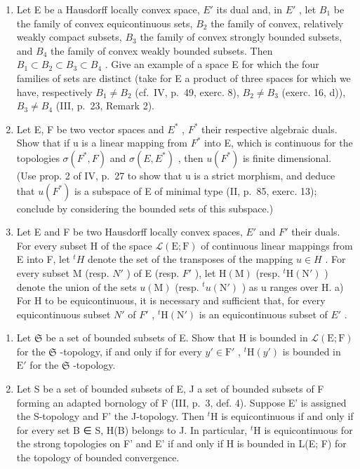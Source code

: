 \begin{enumerate}
\def\labelenumi{\arabic{enumi})}
\setcounter{enumi}{16}
\item
  Let E be a Hausdorff locally convex space, \(E'\) its dual and, in \(E'\) , let \(B_{1}\) be the family of convex equicontinuous sets, \(B_{2}\) the family of convex, relatively weakly compact subsets, \(B_{3}\) the family of convex strongly bounded subsets, and \(B_{4}\) the family of convex weakly bounded subsets. Then \(B_{1} \subset B_{2} \subset B_{3} \subset B_{4}\) . Give an example of a space E for which the four families of sets are distinct (take for E a product of three spaces for which we have, respectively \(B_{1} \neq B_{2}\) (cf.~IV, p.~49, exerc. 8), \(B_{2} \neq B_{3}\) (exerc. 16, d)), \(B_{3} \neq B_{4}\) (III, p.~23, Remark 2).
\item
  Let E, F be two vector spaces and \(E^{*}\) , \(F^{*}\) their respective algebraic duals. Show that if u is a linear mapping from \(F^{*}\) into E, which is continuous for the topologies \(\sigma(F^{*}, F)\) and \(\sigma(E, E^{*})\) , then \(u(F^{*})\) is finite dimensional. (Use prop. 2 of IV, p.~27 to show that u is a strict morphism, and deduce that \(u(F^{*})\) is a subspace of E of minimal type (II, p.~85, exerc. 13); conclude by considering the bounded sets of this subspace.)
\item
  Let E and F be two Hausdorff locally convex spaces, \(E'\) and \(F'\) their duals. For every subset H of the space \(\mathcal{L}(\mathrm{E};\mathrm{F})\) of continuous linear mappings from E into F, let \({}^{t}H\) denote the set of the transposes of the mapping \(u\in H\) . For every subset M (resp. \(N'\) ) of E (resp. \(F'\) ), let \(\mathrm{H}(\mathrm{M})\) (resp. \({}^{t}\mathrm{H}(\mathrm{N}')\) ) denote the union of the sets \(u(\mathrm{M})\) (resp. \({}^{t}u(\mathrm{N}')\) ) as u ranges over H. a) For H to be equicontinuous, it is necessary and sufficient that, for every equicontinuous subset \(N'\) of \(F'\) , \({}^{t}\mathrm{H}(\mathrm{N}')\) is an equicontinuous subset of \(E'\) .
\end{enumerate}

\begin{enumerate}
\def\labelenumi{\alph{enumi})}
\setcounter{enumi}{1}
\item
  Let \(\mathfrak{S}\) be a set of bounded subsets of E. Show that H is bounded in \(\mathcal{L}(\mathrm{E};\mathrm{F})\) for the \(\mathfrak{S}\) -topology, if and only if for every \(y' \in \mathrm{F}'\) , \({}^{t}\mathrm{H}(y')\) is bounded in \(\mathrm{E}'\) for the \(\mathfrak{S}\) -topology.
\item
  Let S be a set of bounded subsets of E, J a set of bounded subsets of F forming an adapted bornology of F (III, p.~3, def. 4). Suppose E' is assigned the S-topology and F' the J-topology. Then \({}^{t}\mathrm{H}\) is equicontinuous if and only if for every set B ∈ S, H(B) belongs to J. In particular, \({}^{t}\mathrm{H}\) is equicontinuous for the strong topologies on F' and E' if and only if H is bounded in L(E; F) for the topology of bounded convergence.
\end{enumerate}

